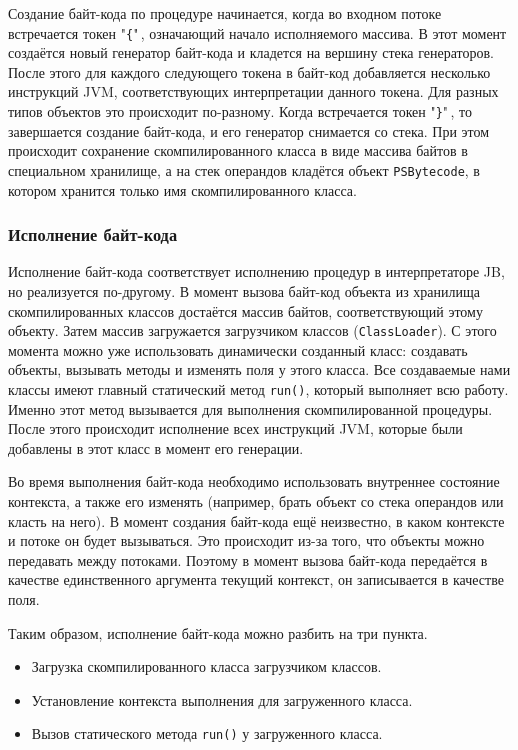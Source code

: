 	Создание байт-кода по процедуре начинается, когда во входном потоке встречается токен "\texttt{\{}"\,, означающий начало исполняемого массива. В этот момент создаётся новый генератор байт-кода и кладется на вершину стека генераторов. После этого для каждого следующего токена в байт-код добавляется несколько инструкций JVM, соответствующих интерпретации данного токена. Для разных типов объектов это происходит по-разному. Когда встречается токен "\texttt{\}}"\,, то завершается создание байт-кода, и его генератор снимается со стека. При этом происходит сохранение скомпилированного класса в виде массива байтов в специальном хранилище, а на стек операндов кладётся объект \texttt{PSBytecode}, в котором хранится только имя скомпилированного класса. 
	\subsubsection*{Исполнение байт-кода}
	Исполнение байт-кода соответствует исполнению процедур в интерпретаторе JB, но реализуется по-другому. В момент вызова байт-код объекта из хранилища скомпилированных классов достаётся массив байтов, соответствующий этому объекту. Затем массив загружается загрузчиком классов (\texttt{ClassLoader}). С этого момента можно уже использовать динамически созданный класс: создавать объекты, вызывать методы и изменять поля у этого класса. Все создаваемые нами классы имеют главный статический метод \texttt{run()}, который выполняет всю работу. Именно этот метод вызывается для выполнения скомпилированной процедуры. После этого происходит исполнение всех инструкций JVM, которые были добавлены в этот класс в момент его генерации.
	
	Во время выполнения байт-кода необходимо использовать внутреннее состояние контекста, а также его изменять (например, брать объект со стека операндов или класть на него). В момент создания байт-кода ещё неизвестно, в каком контексте и потоке он будет вызываться. Это происходит из-за того, что объекты можно передавать между потоками. Поэтому в момент вызова байт-кода передаётся в качестве единственного аргумента текущий контекст, он записывается в качестве поля.
	
	Таким образом, исполнение байт-кода можно разбить на три пункта.
	\begin{itemize}
		\item Загрузка скомпилированного класса загрузчиком классов.
		\item Установление контекста выполнения для загруженного класса.
		\item Вызов статического метода \texttt{run()} у загруженного класса.
	\end{itemize}
